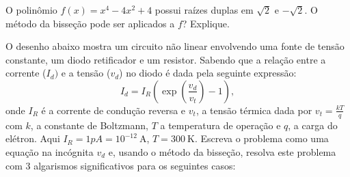 \documentclass[main.tex]{subfiles}
\begin{document}
\begin{Exercise}\label{prob_raiz_dupla} O polinômio $f(x)=x^4-4x^2+4$ possui raízes duplas em $\sqrt{2}$ e $-\sqrt{2}$. O método da bisseção pode ser aplicados a $f$? Explique.
\end{Exercise}

\begin{Exercise}[title=Eletrônica]\label{prob_diodo} O desenho abaixo mostra um circuito não linear envolvendo uma fonte de tensão constante, um diodo retificador e um resistor. Sabendo que a relação entre a corrente ($I_d)$ e a tensão ($v_d$) no diodo é dada pela seguinte expressão:
  \begin{equation*}
    I_d=I_R\left(\exp\left(\frac{v_d}{v_t}\right)-1\right),
  \end{equation*}
onde $I_R$ é a corrente de condução reversa e $v_t$, a tensão térmica dada por $v_t=\frac{kT}{q}$ com $k$, a constante de Boltzmann, $T$ a temperatura de operação e $q$, a carga do elétron. Aqui  $I_R=1pA=10^{-12}~\mbox{A}$, $T=300~\mbox{K}$. Escreva o problema como uma equação na incógnita $v_d$ e, usando o método da bisseção, resolva este problema com 3 algarismos significativos para os seguintes casos:
\end{Exercise}
\end{document}

